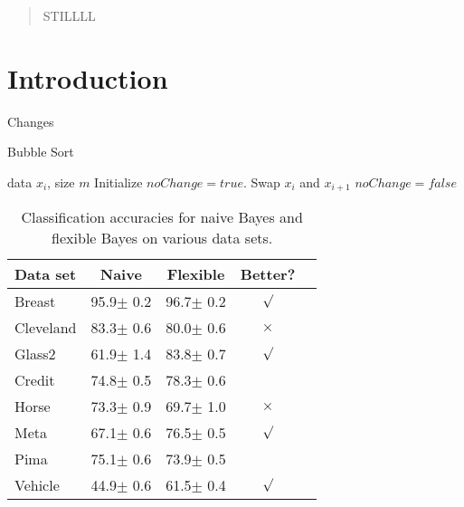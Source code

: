 \documentclass{article}
\begin{document}
 


\begin{abstract} 
STILLLL
\end{abstract} 

\section{Introduction}
\label{intro}

Changes 

\begin{algorithm}[tb]
   \caption{Bubble Sort}
   \label{alg:example}
\begin{algorithmic}
    data $x_i$, size $m$
   \REPEAT
   \STATE Initialize $noChange = true$.
   \STATE Swap $x_i$ and $x_{i+1}$
   \STATE $noChange = false$
   \ENDIF
   \ENDFOR
\end{algorithmic}
\end{algorithm}
 

\begin{table}[t]
\caption{Classification accuracies for naive Bayes and flexible 
Bayes on various data sets.}
\label{sample-table}
\vskip 0.15in
\begin{center}
\begin{small}
\begin{sc}
\begin{tabular}{lcccr}
\hline
\abovespace\belowspace
Data set & Naive & Flexible & Better? \\
\hline
\abovespace
Breast    & 95.9$\pm$ 0.2& 96.7$\pm$ 0.2& $\surd$ \\
Cleveland & 83.3$\pm$ 0.6& 80.0$\pm$ 0.6& $\times$\\
Glass2    & 61.9$\pm$ 1.4& 83.8$\pm$ 0.7& $\surd$ \\
Credit    & 74.8$\pm$ 0.5& 78.3$\pm$ 0.6&         \\
Horse     & 73.3$\pm$ 0.9& 69.7$\pm$ 1.0& $\times$\\
Meta      & 67.1$\pm$ 0.6& 76.5$\pm$ 0.5& $\surd$ \\
Pima      & 75.1$\pm$ 0.6& 73.9$\pm$ 0.5&         \\
\belowspace
Vehicle   & 44.9$\pm$ 0.6& 61.5$\pm$ 0.4& $\surd$ \\
\hline
\end{tabular}
\end{sc}
\end{small}
\end{center}
\vskip -0.1in
\end{table}
\end{document}
